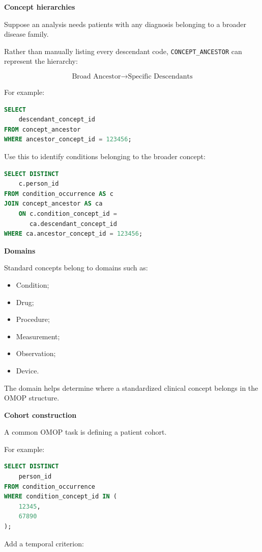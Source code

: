 \documentclass[11pt,letterpaper]{article}
\begin{document}
\textbf{Concept hierarchies}

Suppose an analysis needs patients with any diagnosis belonging to a broader
disease family.

Rather than manually listing every descendant code,
\texttt{CONCEPT\_ANCESTOR} can represent the hierarchy:

\[
\text{Broad Ancestor}
\rightarrow
\text{Specific Descendants}
\]

For example:

\begin{lstlisting}[language=SQL]
SELECT
    descendant_concept_id
FROM concept_ancestor
WHERE ancestor_concept_id = 123456;
\end{lstlisting}

Use this to identify conditions belonging to the broader concept:

\begin{lstlisting}[language=SQL]
SELECT DISTINCT
    c.person_id
FROM condition_occurrence AS c
JOIN concept_ancestor AS ca
    ON c.condition_concept_id =
       ca.descendant_concept_id
WHERE ca.ancestor_concept_id = 123456;
\end{lstlisting}

\textbf{Domains}

Standard concepts belong to domains such as:

\begin{itemize}[leftmargin=*]
    \item Condition;
    \item Drug;
    \item Procedure;
    \item Measurement;
    \item Observation;
    \item Device.
\end{itemize}

The domain helps determine where a standardized clinical concept belongs in
the OMOP structure.

\textbf{Cohort construction}

A common OMOP task is defining a patient cohort.

For example:

\begin{lstlisting}[language=SQL]
SELECT DISTINCT
    person_id
FROM condition_occurrence
WHERE condition_concept_id IN (
    12345,
    67890
);
\end{lstlisting}

Add a temporal criterion:
\end{document}
